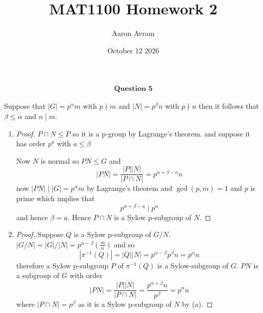 \documentclass[12pt]{article}
\title{MAT1100 Homework 2}
\author{Aaron Avram}
\date{October 12 2026}
\begin{document}
\newtheorem{definition}{Definition}
\newtheorem{theorem}{Theorem}
\newtheorem{claim}{Claim}
\newtheorem{corollary}{Corollary}

\maketitle

\begin{align*}
    \textbf{Question 5}
\end{align*}


Suppose that $|G| = p^\alpha m$ with $p \nmid m$ and
$|N| = p^\beta n$ with $p \nmid n$ then it follows that $\beta \leq \alpha$
and $n \mid m$. 
\begin{enumerate}
    \item[(a)]
    \begin{proof}
        $P \cap N \leq P$ so it is a p-group by Lagrange's theorem.
        and suppose it has order $p^a$ with $a \leq \beta$

        Now $N$ is normal so $PN \leq G$ and
        \[ |PN| = \frac{|P||N|}{|P \cap N|} = p^{\alpha + \beta - a}n \]
        now $|PN| \mid |G| = p^\alpha m$ by Lagrange's theorem and $\gcd(p, m) = 1$ 
        and $p$ is prime which implies that
        \[ p^{\alpha + \beta - a} \mid p^\alpha \]
        and hence $\beta = a$. Hence $P \cap N$ is a Sylow p-subgroup of $N$.
    \end{proof}

    \item[(b)]
    \begin{proof}
        Suppose $Q$ is a Sylow p-subgroup of $G/N$.
        $|G/N| = |G|/|N| = p^{\alpha - \beta}(\frac{m}{n})$
        and so
        \[ |\pi^{-1}(Q)| = |Q||N| = p^{\alpha - \beta}p^\beta n = p^\alpha n \]
        therefore a Sylow p-subgroup $P$ of $\pi^{-1}(Q)$ is a Sylow-subgroup of $G$.
        $PN$ is a subgroup of $G$ with order
        \[ |PN| = \frac{|P||N|}{|P \cap N |} = \frac{p^{\alpha + \beta}n}{p^\beta} = p^\alpha n \]
        where $|P \cap N| = p^\beta$ as it is a Sylow p-subgroup of $N$ by (a).



\end{proof}
\end{enumerate}
\end{document}

